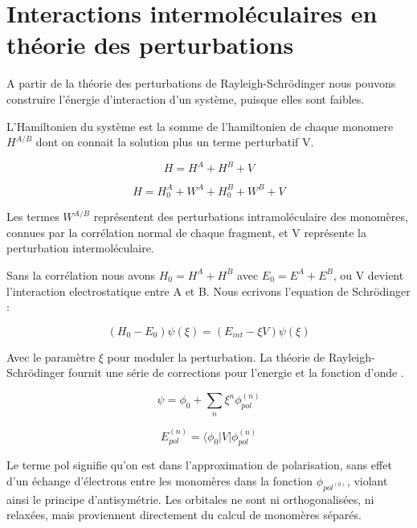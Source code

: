 \singlespacing
\section{Interactions intermoléculaires en théorie des perturbations}

A partir de la théorie des perturbations de Rayleigh-Schr\"{o}dinger nous pouvons construire l'énergie d'interaction d'un système, puisque elles sont faibles. 

L'Hamiltonien du système est la somme de l'hamiltonien de chaque monomere $H^{A/B}$ dont on connait la solution plus un terme perturbatif V. 

\begin{equation}
H = H^{A} + H^{B} + V
\end{equation}

\begin{equation}
H = H_{0}^{A} + W^{A} + H_{0}^{B} + W^{B} + V
\end{equation}

Les termes $W^{A/B}$ représentent des perturbations intramoléculaire des monomères, connues par la corrélation normal de chaque fragment, et V représente la perturbation intermoléculaire. 

Sans la corrélation nous avons $H_{0} = H^{A} + H^{B}$ avec $E_{0} = E^{A} + E^{B}$, ou V devient l'interaction electrostatique entre A et B. Nous ecrivons l'equation de Schr\"{o}dinger :

\begin{equation}
(H_{0} - E_{0}) \psi (\xi) = (E_{int} - \xi V) \psi (\xi)
\end{equation}

Avec le paramètre $\xi$ pour moduler la perturbation. La théorie de Rayleigh-Schr\"{o}dinger fournit une série de corrections pour l'energie et la fonction d'onde \cite{chipman1973perturbation}.

\begin{equation}
\psi = \phi_{0} + \sum_{n} \xi^{n} \phi_{pol}^{(n)}
\end{equation}

\begin{equation}
E_{pol}^{(n)} = \langle \phi_{0}|V| \phi_{pol}^{(n)}
\end{equation}

Le terme \og pol \fg{} signifie qu’on est dans l'approximation de polarisation, sans effet d'un échange d’électrons entre les monomères dans la fonction $\phi_{pol^{(0)}}$, violant ainsi le principe d’antisymétrie. Les orbitales ne sont ni orthogonalisées, ni relaxées, mais proviennent directement du calcul de monomères séparés.

